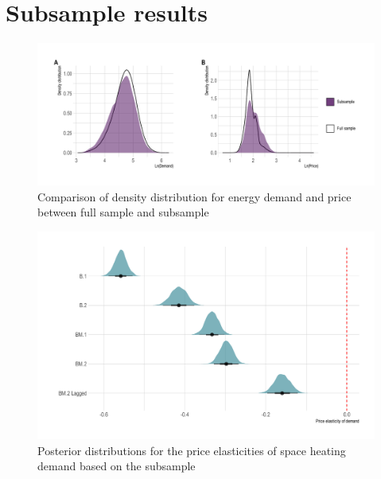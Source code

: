 \documentclass[12pt,twoside]{reedthesis}
\begin{document}
\hypertarget{subsample_results}{%
\section{Subsample results}\label{subsample_results}}
\begin{figure}

{\centering \includegraphics[width=1\linewidth]{figure/density-distribution-comparison-samples} 

}

\caption{Comparison of density distribution for energy demand and price between full sample and subsample}\label{fig:density-distribution-comparison-samples}
\end{figure}
\begin{figure}

{\centering \includegraphics[width=1\linewidth]{figure/posterior-distributions} 

}

\caption{Posterior distributions for the price elasticities of space heating demand based on the subsample}\label{fig:posterior-distributions}
\end{figure}
\end{document}
